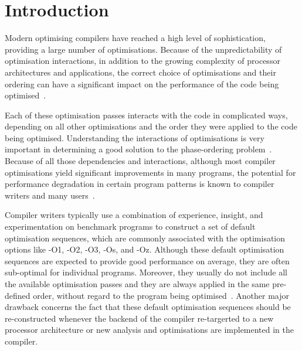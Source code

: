 
\chapter{Introduction}

Modern optimising compilers have reached a high level of sophistication, providing a large number of optimisations.
Because of the unpredictability of optimisation interactions, in addition to the growing complexity of processor architectures and applications, the correct choice of optimisations and their ordering can have a significant impact on the performance of the code being optimised~\citep{pan06,fursin07,kulkarni12,purini13}.

Each of these optimisation passes interacts with the code in complicated ways, depending on all other optimisations and the order they were applied to the code being optimised.
Understanding the interactions of optimisations is very important in determining a good solution to the phase-ordering problem~\citep{touati06,kulkarni12}.
Because of all those dependencies and interactions, although most compiler optimisations yield significant improvements in many programs, the potential for performance degradation in certain program patterns is known to compiler writers and many users~\citep{pan06,zhou12,kulkarni12}.

Compiler writers typically use a combination of experience, insight, and experimentation on benchmark programs to construct a set of default optimisation sequences,
which are commonly associated with the optimisation options like {\flagstype -O1}, {\flagstype -O2}, {\flagstype -O3}, {\flagstype -Os}, and {\flagstype -Oz}.
Although these default optimisation sequences are expected to provide good performance on average, they are often sub-optimal for individual programs.
Moreover, they usually do not include all the available optimisation passes and they are always applied in the same pre-defined order, without regard to the program being optimised~\citep{pan06,cavazos07,zhou12,kulkarni12}.
Another major drawback concerns the fact that these default optimisation sequences should be re-constructed whenever the backend of the compiler re-targerted to a new processor architecture or new analysis and optimisations are implemented in the compiler.

